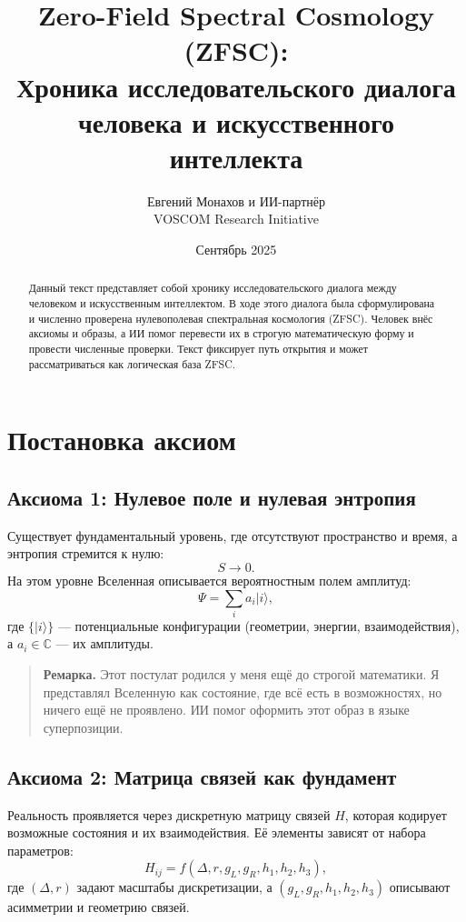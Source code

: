 \documentclass[12pt,a4paper]{article}
\title{Zero-Field Spectral Cosmology (ZFSC): \\
Хроника исследовательского диалога человека и искусственного интеллекта}
\author{Евгений Монахов и ИИ-партнёр \\ VOSCOM Research Initiative}
\date{Сентябрь 2025}
\begin{document}
\maketitle

\begin{abstract}
Данный текст представляет собой хронику исследовательского диалога между человеком и искусственным интеллектом.  
В ходе этого диалога была сформулирована и численно проверена нулевополевая спектральная космология (ZFSC).  
Человек внёс аксиомы и образы, а ИИ помог перевести их в строгую математическую форму и провести численные проверки.  
Текст фиксирует путь открытия и может рассматриваться как логическая база ZFSC.
\end{abstract}

\section{Постановка аксиом}

\subsection{Аксиома 1: Нулевое поле и нулевая энтропия}
Существует фундаментальный уровень, где отсутствуют пространство и время, 
а энтропия стремится к нулю:
\[
S \to 0.
\]
На этом уровне Вселенная описывается вероятностным полем амплитуд:
\[
\Psi = \sum_{i} a_i |i\rangle , 
\]
где $\{|i\rangle\}$ — потенциальные конфигурации (геометрии, энергии, взаимодействия), 
а $a_i \in \mathbb{C}$ — их амплитуды.

\begin{quote}\textbf{Ремарка.}  
Этот постулат родился у меня ещё до строгой математики. 
Я представлял Вселенную как состояние, где всё есть в возможностях, но ничего ещё не проявлено.  
ИИ помог оформить этот образ в языке суперпозиции.
\end{quote}

\subsection{Аксиома 2: Матрица связей как фундамент}
Реальность проявляется через дискретную матрицу связей $H$, 
которая кодирует возможные состояния и их взаимодействия.  
Её элементы зависят от набора параметров:
\[
H_{ij} = f(\Delta, r, g_L, g_R, h_1,h_2,h_3),
\]
где $(\Delta, r)$ задают масштабы дискретизации, 
а $(g_L,g_R,h_1,h_2,h_3)$ описывают асимметрии и геометрию связей.
\end{document}
